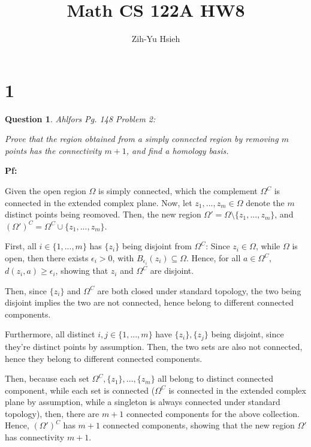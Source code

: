 \documentclass{article}
\title{Math CS 122A HW8}
\author{Zih-Yu Hsieh}
\newtheorem{question}{Question}
\begin{document}
\maketitle

\section*{1}
\begin{myBox}[]{}
    \begin{question}
        Ahlfors Pg. 148 Problem 2:

        Prove that the region obtained from a simply connected region by
        removing $m$ points has the connectivity $m + 1$, and find a homology basis.
    \end{question}
\end{myBox}

\textbf{Pf:}

Given the open region $\Omega$ is simply connected, which the complement $\Omega^C$ is connected in the extended complex plane.
Now, let $z_1,...,z_m\in \Omega$ denote the $m$ distinct points being reomoved. Then, the new region $\Omega' = \Omega\setminus\{z_1,...,z_m\}$,
and $(\Omega')^C = \Omega^C \cup \{z_1,...,z_m\}$.

First, all $i\in\{1,...,m\}$ has $\{z_i\}$ being disjoint from $\Omega^C$: Since $z_i\in\Omega$, while $\Omega$ is open, then there exists $\epsilon_i>0$,
with $B_{\epsilon_i}(z_i)\subseteq \Omega$. Hence, for all $a\in \Omega^C$, $d(z_i,a)\geq \epsilon_i$, showing that $z_i$ and $\Omega^C$ are disjoint.

Then, since $\{z_i\}$ and $\Omega^C$ are both closed under standard topology, the two being disjoint implies the two are not connected, hence belong to different connected components.

Furthermore, all distinct $i,j\in\{1,...,m\}$ have $\{z_i\},\{z_j\}$ being disjoint, since they're distinct points by assumption. Then, the two sets are also not connected, hence they belong to different connected components.

Then, because each set $\Omega^C, \{z_1\},...,\{z_m\}$ all belong to distinct connected component, while each set is connected ($\Omega^C$ is connected in the extended complex plane by assumption, while a singleton is always connected under standard topology),
then, there are $m+1$ connected components for the above collection. Hence, $(\Omega')^C$ has $m+1$ connected components, showing that the new region $\Omega'$ has connectivity $m+1$.
\end{document}
